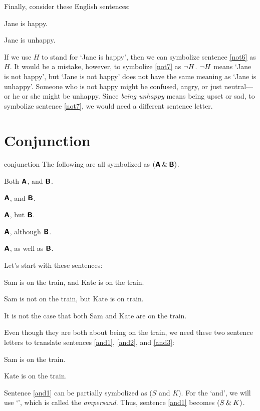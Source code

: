 Finally, consider these English sentences:
	\begin{earg}
		\item[\ex{not6}] Jane is happy.
		\item[\ex{not7}] Jane is unhappy.
	\end{earg}
If we use $H$ to stand for `Jane is happy', then we can symbolize sentence \ref{not6} as $H$. It would be a mistake, however, to symbolize \ref{not7} as ${\neg}{H}$. 
${\neg}{H}$ means `Jane is not happy', but `Jane is not happy' does not have the same meaning as `Jane is unhappy'. Someone who is not happy might be confused, angry, or just neutral---or he or she might be unhappy. Since \textit{being unhappy} means being upset or sad, to symbolize sentence \ref{not7}, we would need a different sentence letter.

\section{Conjunction}
\label{s:ConnectiveConjunction}

\begin{factboxy}{conjunction}
The following are all symbolized as $(\bm{\mathsf{A}}\mathbin{\&}\bm{\mathsf{B}})$.
\vspace{-2mm}
\begin{earg}
\item[] Both $\bm{\mathsf{A}}$, and $\bm{\mathsf{B}}$.
\item[] $\bm{\mathsf{A}}$, and $\bm{\mathsf{B}}$.
\item[] $\bm{\mathsf{A}}$, but $\bm{\mathsf{B}}$. 
\item[] $\bm{\mathsf{A}}$, although $\bm{\mathsf{B}}$.
\item[] $\bm{\mathsf{A}}$, as well as $\bm{\mathsf{B}}$.
\end{earg}
\end{factboxy}

Let's start with these sentences:
	\begin{earg}
		\item[\ex{and1}] Sam is on the train, and Kate is on the train.
		\item[\ex{and2}] Sam is not on the train, but Kate is on train.
		\item[\ex{and3}] It is not the case that both Sam and Kate are on the train.
	\end{earg}
Even though they are both about being on the train, we need these two sentence letters to translate sentences \ref{and1}, \ref{and2}, and \ref{and3}:
	\begin{ekey}
		\item[S] Sam is on the train.
		\item[K] Kate is on the train.
	\end{ekey}
Sentence \ref{and1} can be partially symbolized as ($S$ and $K$). For the `and', we will use `\eand', which is called the \textit{ampersand}. Thus, sentence \ref{and1} becomes $(S\mathbin{\&} K)$. 

